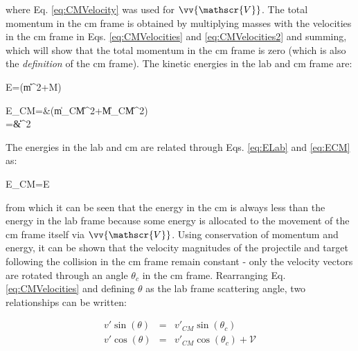 where Eq. \eqref{eq:CMVelocity} was used for \(\vv{\mathscr{V}}\). The total momentum in the \gls{cm} frame is obtained by multiplying masses with the velocities in the \gls{cm} frame in Eqs. \eqref{eq:CMVelocities} and \eqref{eq:CMVelocities2} and summing, which will show that the total momentum in the \gls{cm} frame is zero (which is also the {\it definition} of the \gls{cm} frame). The kinetic energies in the lab and \gls{cm} frame are:

\beq
\label{eq:ELab}
E=\left(m\|\|^2+M\right)
\eeq

\beqa
\label{eq:ECM}
E_{CM}=&\left(m\|_{CM}\|^2+M\|_{CM}\|^2\right)\\
=&\|\|^2
\eeqa

The energies in the lab and \gls{cm} are related through Eqs. \eqref{eq:ELab} and \eqref{eq:ECM} as:

\beq
E_{CM}=E
\eeq

from which it can be seen that the energy in the \gls{cm} is always less than the energy in the lab frame because some energy is allocated to the movement of the \gls{cm} frame itself via \(\vv{\mathscr{V}}\). Using conservation of momentum and energy, it can be shown that the velocity magnitudes of the projectile and target following the collision in the \gls{cm} frame remain constant - only the velocity vectors are rotated through an angle \(\theta_c\) in the \gls{cm} frame. Rearranging Eq. \eqref{eq:CMVelocities} and defining \(\theta\) as the lab frame scattering angle, two relationships can be written:

\begin{subequations}
\label{eq:CMvsLab}
\begin{eqnarray}
v'\sin{(\theta)}&=&v'_{CM}\sin{(\theta_c)}\\
v'\cos{(\theta)}&=&v'_{CM}\cos{(\theta_c)}+\mathscr{V}
\end{eqnarray}
\end{subequations}


